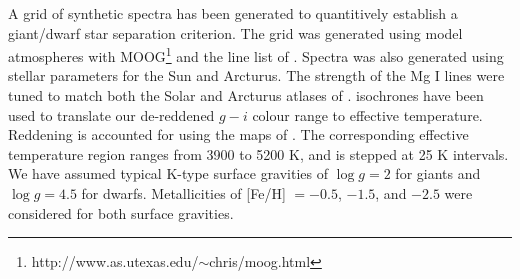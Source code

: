 \documentclass[preprint2]{aastex}
\begin{document}

A grid of synthetic spectra has been generated to quantitively establish a giant/dwarf star separation criterion. The grid was generated using \citet{Castelli;Kurucz_2004} model atmospheres with MOOG\footnote{http://www.as.utexas.edu/$\sim$chris/moog.html} and the line list of \citet{Kurucz;Bell_1995}. Spectra was also generated using stellar parameters for the Sun and Arcturus. The strength of the Mg I lines were tuned to match both the Solar and Arcturus atlases of \citet{Hinkle;et-al_2003}. \citet{Girardi;et-al_2004} isochrones have been used to translate our de-reddened $g - i$ colour range to effective temperature. Reddening is accounted for using the maps of \citet{Schlegel;Finkbeiner;Davis_1998}. The corresponding effective temperature region ranges from 3900 to 5200 K, and is stepped at 25 K intervals. We have assumed typical K-type surface gravities of $\log{g} = 2$ for giants and $\log{g} = 4.5$ for dwarfs. Metallicities of [Fe/H] $= -0.5$, $-1.5$, and $-2.5$ were considered for both surface gravities.
\end{document}
